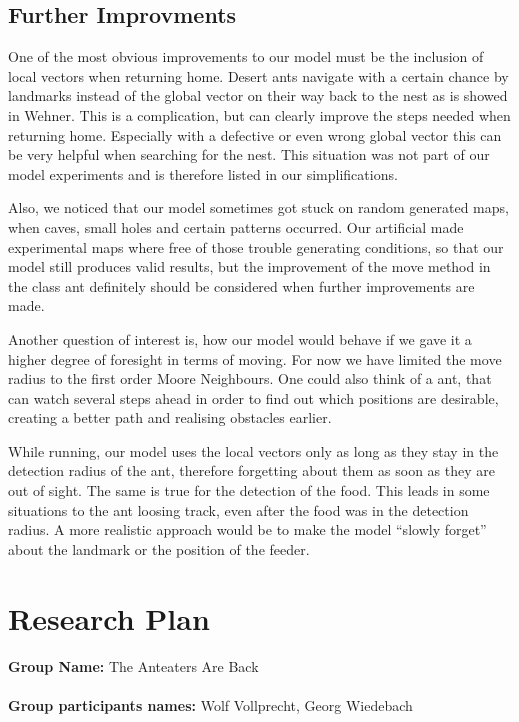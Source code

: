 \documentclass[11pt]{article}
\begin{document}
\subsection{Further Improvments}
One of the most obvious improvements to our model must be the inclusion of local vectors when returning home. Desert ants navigate with a certain chance by landmarks instead of the global vector on their way back to the nest as is showed in Wehner\cite{wehner98}. This is a complication, but can clearly improve the steps needed when returning home. Especially with a defective or even wrong global vector this can be very helpful when searching for the nest. This situation was not part of our model experiments and is therefore listed in our simplifications.

Also, we noticed that our model sometimes got stuck on random generated maps, when caves, small holes and certain patterns occurred. Our artificial made experimental maps where free of those trouble generating conditions, so that our model still produces valid results, but the improvement of the move method in the class ant definitely should be considered when further improvements are made.

Another question of interest is, how our model would behave if we gave it a higher degree of foresight in terms of moving. For now we have limited the move radius to the first order Moore Neighbours. One could also think of a ant, that can watch several steps ahead in order to find out which positions are desirable, creating a better path and realising obstacles earlier.

While running, our model uses the local vectors only as long as they stay in the detection radius of the ant, therefore forgetting about them as soon as they are out of sight. The same is true for the detection of the food. This leads in some situations to the ant loosing track, even after the food was in the detection radius. A more realistic approach would be to make the model “slowly forget” about the landmark or the position of the feeder.

\newpage
\appendix

\section{Research Plan}
\textbf{Group Name:} The Anteaters Are Back\\ \\
\textbf{Group participants names:} Wolf Vollprecht, Georg Wiedebach
\end{document}
